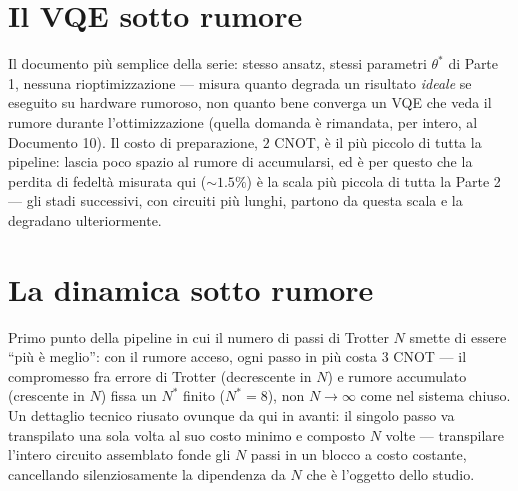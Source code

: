 \documentclass[11pt,a4paper]{article}
\begin{document}

\section{Il VQE sotto rumore}

Il documento più semplice della serie: stesso ansatz, stessi parametri
$\theta^*$ di Parte 1, nessuna rioptimizzazione --- misura quanto degrada
un risultato \emph{ideale} se eseguito su hardware rumoroso, non quanto
bene converga un VQE che veda il rumore durante l'ottimizzazione (quella
domanda è rimandata, per intero, al Documento 10). Il costo di
preparazione, $2$ CNOT, è il più piccolo di tutta la pipeline: lascia poco
spazio al rumore di accumularsi, ed è per questo che la perdita di
fedeltà misurata qui ($\sim1.5\%$) è la scala più piccola di tutta la
Parte 2 --- gli stadi successivi, con circuiti più lunghi, partono da
questa scala e la degradano ulteriormente.

\section{La dinamica sotto rumore}

Primo punto della pipeline in cui il numero di passi di Trotter $N$
smette di essere ``più è meglio'': con il rumore acceso, ogni passo in
più costa $3$ CNOT --- il compromesso fra errore di Trotter (decrescente
in $N$) e rumore accumulato (crescente in $N$) fissa un $N^*$ finito
($N^*=8$), non $N\to\infty$ come nel sistema chiuso. Un dettaglio tecnico
riusato ovunque da qui in avanti: il singolo passo va transpilato una
sola volta al suo costo minimo e composto $N$ volte --- transpilare
l'intero circuito assemblato fonde gli $N$ passi in un blocco a costo
costante, cancellando silenziosamente la dipendenza da $N$ che è
l'oggetto dello studio.

\end{document}
